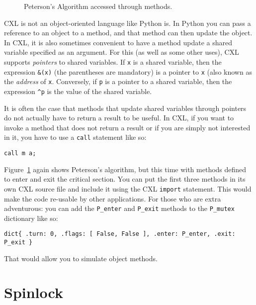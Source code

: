 \documentclass{report}
\newenvironment{code}{
\tcolorbox
}{
\endtcolorbox
}
\begin{document}
\begin{figure}
\begin{code}

\end{code}
\caption{Peterson's Algorithm accessed through methods.}
\label{fig:petersonmethods}
\end{figure}

CXL is not an object-oriented language like Python is.  In Python
you can pass a reference to an object to a method, and that method
can then update the object.  In CXL, it is also sometimes convenient
to have a method update a shared variable specified as an argument.
For this (as well as some other uses), CXL supports \emph{pointers}
to shared variables.
If \texttt{x} is a shared variable, then the expression \texttt{\&(x)}
(the parentheses are mandatory) is a pointer to \texttt{x}
(also known as the \emph{address} of \texttt{x}.
Conversely, if \texttt{p} is a pointer to a shared variable, then the
expression \texttt{\^{}p} is the value of the shared variable.

It is often the case that methods that update shared variables through
pointers do not actually have to return a result to be useful.
In CXL, if you want to invoke a method that does not return a result
or if you are simply not interested in it,
you have to use a \texttt{call} statement like so:
\begin{code}
\begin{verbatim}
call m a;
\end{verbatim}
\end{code}

Figure~\ref{fig:petersonmethods} again shows Peterson's algorithm,
but this time with methods defined to enter and exit the critical
section.
You can put the first three methods in its own CXL source file
and include it using the CXL \texttt{import} statement.  This would
make the code re-usable by other applications.  For those who are
extra adventurous: you can add the \texttt{P\_enter} and
\texttt{P\_exit} methods to the \texttt{P\_mutex} dictionary
like so:
\begin{code}
\begin{verbatim}
dict{ .turn: 0, .flags: [ False, False ], .enter: P_enter, .exit: P_exit }
\end{verbatim}
\end{code}
That would allow you to simulate object methods.

\chapter{Spinlock}
\end{document}
